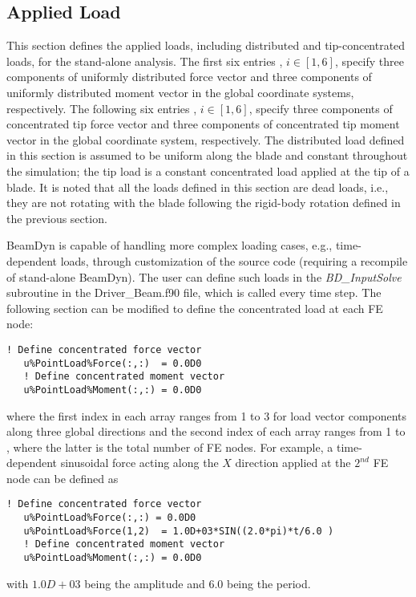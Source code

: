 \subsection{Applied Load}
This section defines the applied loads, including distributed and tip-concentrated loads, for the stand-alone analysis. 
The first six entries , $i \in [1,6]$, specify three components of uniformly distributed force vector and three components of uniformly distributed moment vector in the global coordinate systems, respectively. 
The following six entries , $i \in [1,6]$, specify three components of concentrated tip force vector and three components of concentrated tip moment vector in the global coordinate system, respectively. 
The distributed load defined in this section is assumed to be uniform along the blade and constant throughout the simulation; the tip load is a constant concentrated load applied at the tip of a blade. It is noted that all the loads defined in this section are dead loads, i.e., they are not rotating with the blade following the rigid-body rotation defined in the previous section. 

BeamDyn is capable of handling more complex loading cases, e.g., time-dependent loads, through customization of the source code (requiring a recompile of stand-alone BeamDyn). 
The user can define such loads in the \textit{BD\_InputSolve} subroutine in the Driver\_Beam.f90 file, which is called every time step. 
The following section can be modified to define the concentrated load at each FE node:

\begin{lstlisting}[frame = single]
   ! Define concentrated force vector
   u%PointLoad%Force(:,:)  = 0.0D0
   ! Define concentrated moment vector
   u%PointLoad%Moment(:,:) = 0.0D0
\end{lstlisting}
where the first index in each array ranges from 1 to 3 for load vector components along three global directions and the second index of each array ranges from 1 to  , where the latter is the total number of FE nodes. 
For example, a time-dependent sinusoidal force acting along the $X$ direction applied at the $2^{nd}$ FE node can be defined as
\begin{lstlisting}[frame = single]
   ! Define concentrated force vector
   u%PointLoad%Force(:,:) = 0.0D0
   u%PointLoad%Force(1,2)  = 1.0D+03*SIN((2.0*pi)*t/6.0 )
   ! Define concentrated moment vector
   u%PointLoad%Moment(:,:) = 0.0D0
\end{lstlisting}
with $1.0D+03$ being the amplitude and $6.0$ being the period.

